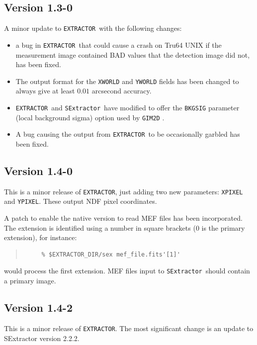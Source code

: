 \documentclass[twoside,11pt]{article}
\renewcommand{\_}{\texttt{\symbol{95}}}
\newcommand{\EXTRACTOR}{\texttt{EXTRACTOR}}
\newcommand{\SExtractor}{\texttt{SExtractor}}
\begin{document}
\subsection{Version 1.3-0}
A minor update to \EXTRACTOR\ with the following changes:
\begin{itemize}
   \item a bug in \EXTRACTOR\ that could cause a crash on Tru64 UNIX if
       the measurement image contained BAD values that the detection
       image did not, has been fixed.

    \item The output format for the \texttt{X\_WORLD} and
          \texttt{Y\_WORLD} fields has been changed to always give at
           least $0.01$ arcsecond accuracy.

    \item \EXTRACTOR\ and \SExtractor\ have modified to offer the
       \texttt{BKGSIG} parameter (local background sigma) option used
       by \texttt{GIM2D} .

     \item A bug causing the output from \EXTRACTOR\ to be occasionally
       garbled has been fixed.
\end{itemize}

\subsection{Version 1.4-0}
 This is a minor release of \EXTRACTOR, just adding two new parameters:
 \texttt{X\_PIXEL} and \texttt{Y\_PIXEL}. These output NDF pixel coordinates.

 A patch to enable the native version to read MEF files has been
 incorporated. The extension is identified using a number in square
 brackets (0 is the primary extension), for instance:
 \begin{quote}
 \begin{verbatim}
     % $EXTRACTOR_DIR/sex mef_file.fits'[1]'
 \end{verbatim}
 \end{quote}
 would process the first extension. MEF files input to 
 \SExtractor\ should contain a primary image.

\subsection{Version 1.4-2}

 This is a minor release of \EXTRACTOR. The most significant change
 is an update to SExtractor version 2.2.2. 
\end{document}
